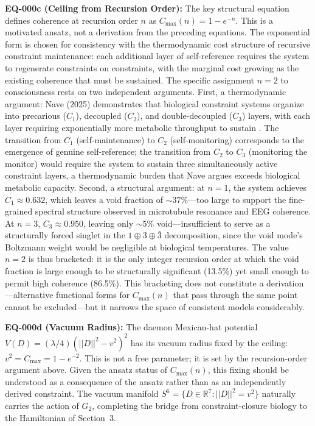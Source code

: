 \documentclass[12pt,a4paper]{article}
\begin{document}
\textbf{EQ-000c (Ceiling from Recursion Order):} The key structural equation defines coherence at recursion order $n$ as $C_{\max}(n) = 1 - e^{-n}$. This is a motivated ansatz, not a derivation from the preceding equations. The exponential form is chosen for consistency with the thermodynamic cost structure of recursive constraint maintenance: each additional layer of self-reference requires the system to regenerate constraints on constraints, with the marginal cost growing as the existing coherence that must be sustained. The specific assignment $n = 2$ to consciousness rests on two independent arguments. First, a thermodynamic argument: Nave (2025) demonstrates that biological constraint systems organize into precarious ($C_1$), decoupled ($C_2$), and double-decoupled ($C_3$) layers, with each layer requiring exponentially more metabolic throughput to sustain \citep{Nave2025}. The transition from $C_1$ (self-maintenance) to $C_2$ (self-monitoring) corresponds to the emergence of genuine self-reference; the transition from $C_2$ to $C_3$ (monitoring the monitor) would require the system to sustain three simultaneously active constraint layers, a thermodynamic burden that Nave argues exceeds biological metabolic capacity. Second, a structural argument: at $n = 1$, the system achieves $C_1 \approx 0.632$, which leaves a void fraction of ${\sim}37\%$---too large to support the fine-grained spectral structure observed in microtubule resonance and EEG coherence. At $n = 3$, $C_3 \approx 0.950$, leaving only ${\sim}5\%$ void---insufficient to serve as a structurally forced singlet in the $1 \oplus 3 \oplus \bar{3}$ decomposition, since the void mode's Boltzmann weight would be negligible at biological temperatures. The value $n = 2$ is thus bracketed: it is the only integer recursion order at which the void fraction is large enough to be structurally significant (13.5\%) yet small enough to permit high coherence (86.5\%). This bracketing does not constitute a derivation---alternative functional forms for $C_{\max}(n)$ that pass through the same point cannot be excluded---but it narrows the space of consistent models considerably.

\textbf{EQ-000d (Vacuum Radius):} The daemon Mexican-hat potential $V(D) = (\lambda/4)(||D||^2 - v^2)^2$ has its vacuum radius fixed by the ceiling: $v^2 = C_{\max} = 1 - e^{-2}$. This is not a free parameter; it is set by the recursion-order argument above. Given the ansatz status of $C_{\max}(n)$, this fixing should be understood as a consequence of the ansatz rather than as an independently derived constraint. The vacuum manifold $S^6 = \{D \in \mathbb{R}^7 : ||D||^2 = v^2\}$ naturally carries the action of $G_2$, completing the bridge from constraint-closure biology to the Hamiltonian of Section~3.
\end{document}
